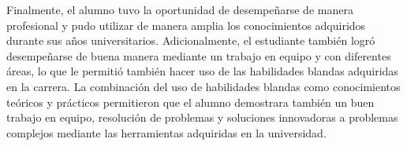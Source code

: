   Finalmente, el alumno tuvo la oportunidad de desempeñarse de manera profesional y pudo utilizar de manera amplia los conocimientos adquiridos durante sus años universitarios. Adicionalmente, el estudiante también logró desempeñarse de buena manera mediante un trabajo en equipo y con diferentes áreas, lo que le permitió también hacer uso de las habilidades blandas adquiridas en la carrera. La combinación del uso de habilidades blandas como conocimientos teóricos y prácticos permitieron que el alumno demostrara también un buen trabajo en equipo, resolución de problemas y soluciones innovadoras a problemas complejos mediante las herramientas adquiridas en la universidad.